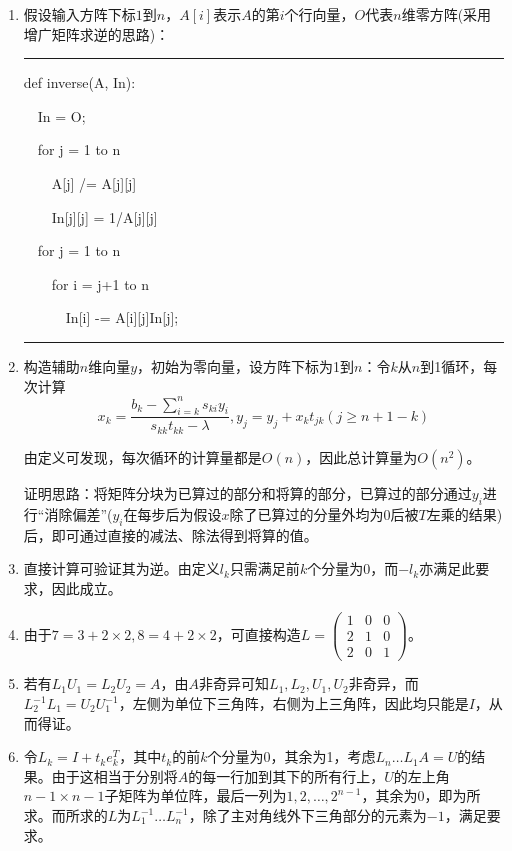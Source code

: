 \documentclass[a4paper,UTF8,fontset=windows]{ctexart}
\newenvironment{code}{\rule{36em}{0.1em}\setlength{\parindent}{1em}\setmainfont{Consolas}

}{

\setlength{\parindent}{0em}\rule{36em}{0.1em}}
\begin{document}
\begin{enumerate}
\item 
假设输入方阵下标$1$到$n$，$A[i]$表示$A$的第$i$个行向量，$O$代表$n$维零方阵(采用增广矩阵求逆的思路)：

\begin{code}
def inverse(A, In): 

\ \ In = O;

\ \ for j = 1 to n

\ \ \ \ A[j] /= A[j][j]

\ \ \ \ In[j][j] = 1/A[j][j]

\ \ for j = 1 to n

\ \ \ \ for i = j+1 to n

\ \ \ \ \ \ In[i] -= A[i][j]In[j];

\end{code}

\item
构造辅助$n$维向量$y$，初始为零向量，设方阵下标为1到$n$：令$k$从$n$到1循环，每次计算
$$x_k=\frac{b_k-\sum_{i=k}^ns_{ki}y_i}{s_{kk}t_{kk}-\lambda},y_j=y_j+x_kt_{jk}(j\ge n+1-k)$$

由定义可发现，每次循环的计算量都是$O(n)$，因此总计算量为$O(n^2)$。

证明思路：将矩阵分块为已算过的部分和将算的部分，已算过的部分通过$y_i$进行“消除偏差”($y_i$在每步后为假设$x$除了已算过的分量外均为0后被$T$左乘的结果)后，即可通过直接的减法、除法得到将算的值。

\item
直接计算可验证其为逆。由定义$l_k$只需满足前$k$个分量为0，而$-l_k$亦满足此要求，因此成立。

\item
由于$7=3+2\times2,8=4+2\times2$，可直接构造$L=\begin{pmatrix}1&0&0\\2&1&0\\2&0&1\end{pmatrix}$。

\item
若有$L_1U_1=L_2U_2=A$，由$A$非奇异可知$L_1,L_2,U_1,U_2$非奇异，而$L_2^{-1}L_1=U_2U_1^{-1}$，左侧为单位下三角阵，右侧为上三角阵，因此均只能是$I$，从而得证。

\item
令$L_k=I+t_ke_k^T$，其中$t_k$的前$k$个分量为0，其余为1，考虑$L_n\dots L_1A=U$的结果。由于这相当于分别将$A$的每一行加到其下的所有行上，$U$的左上角$n-1\times n-1$子矩阵为单位阵，最后一列为$1,2,\dots,2^{n-1}$，其余为0，即为所求。而所求的$L$为$L_1^{-1}\dots L_n^{-1}$，除了主对角线外下三角部分的元素为$-1$，满足要求。


\end{enumerate}
\end{document}

